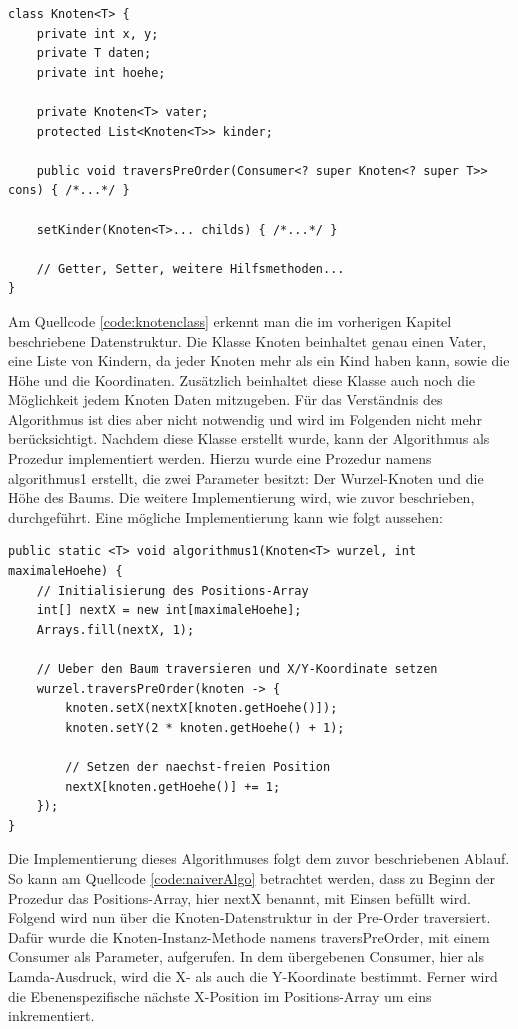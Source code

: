 \begin{lstlisting}[caption=Vereinfachte Implementierung der Knotenklasse, label=code:knotenclass]
class Knoten<T> {
	private int x, y;
	private T daten;
	private int hoehe;
	
	private Knoten<T> vater;
	protected List<Knoten<T>> kinder;

	public void traversPreOrder(Consumer<? super Knoten<? super T>> cons) { /*...*/ }

	setKinder(Knoten<T>... childs) { /*...*/ }

	// Getter, Setter, weitere Hilfsmethoden...
}
\end{lstlisting}
Am Quellcode \ref{code:knotenclass} erkennt man die im vorherigen Kapitel beschriebene Datenstruktur. Die Klasse Knoten beinhaltet genau einen
Vater, eine Liste von Kindern, da jeder Knoten mehr als ein Kind haben kann, sowie die Höhe und die Koordinaten. Zusätzlich beinhaltet diese 
Klasse auch noch die Möglichkeit jedem Knoten Daten mitzugeben. Für das Verständnis des Algorithmus ist dies aber nicht notwendig und wird
im Folgenden nicht mehr berücksichtigt. Nachdem diese Klasse erstellt wurde, kann der Algorithmus als Prozedur implementiert werden.
Hierzu wurde eine Prozedur namens \glqq algorithmus1\grqq{} erstellt, die zwei Parameter besitzt: Der Wurzel-Knoten
und die Höhe des Baums. Die weitere Implementierung wird, wie zuvor beschrieben, durchgeführt. Eine mögliche Implementierung
kann wie folgt aussehen:

\begin{lstlisting}[caption=Implementierung des naiven Algorithmus, label=code:naiverAlgo]
public static <T> void algorithmus1(Knoten<T> wurzel, int maximaleHoehe) {
	// Initialisierung des Positions-Array
	int[] nextX = new int[maximaleHoehe];
	Arrays.fill(nextX, 1);
	
	// Ueber den Baum traversieren und X/Y-Koordinate setzen
	wurzel.traversPreOrder(knoten -> {
		knoten.setX(nextX[knoten.getHoehe()]);
		knoten.setY(2 * knoten.getHoehe() + 1);
		
		// Setzen der naechst-freien Position
		nextX[knoten.getHoehe()] += 1;
	});
}
\end{lstlisting}

Die Implementierung dieses Algorithmuses folgt dem zuvor beschriebenen Ablauf. So kann am Quellcode \ref{code:naiverAlgo} betrachtet werden, dass zu
Beginn der Prozedur das Positions-Array, hier \glqq nextX\grqq{} benannt, mit Einsen befüllt wird. Folgend wird nun über die Knoten-Datenstruktur
in der Pre-Order traversiert. Dafür wurde die Knoten-Instanz-Methode namens \glqq traversPreOrder\grqq{}, mit einem Consumer als Parameter, aufgerufen.
In dem übergebenen Consumer, hier als Lamda-Ausdruck, wird die X- als auch die Y-Koordinate bestimmt. Ferner wird die
Ebenenspezifische nächste X-Position im Positions-Array um eins inkrementiert.

